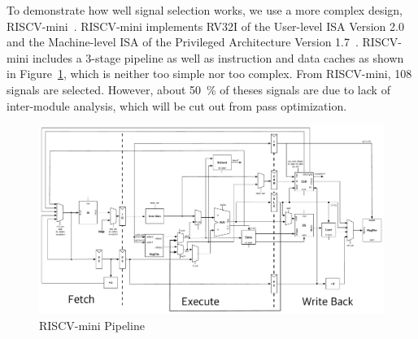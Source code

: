 To demonstrate how well signal selection works, we use a more complex design, RISCV-mini~\cite{riscv-mini}. 
RISCV-mini implements RV32I of the User-level ISA Version 2.0~\cite{riscv-user-2.0} and
the Machine-level ISA of the Privileged Architecture Version 1.7~\cite{riscv-prev-1.7}.
RISCV-mini includes a 3-stage pipeline as well as instruction and data caches as shown
in Figure~\ref{fig:riscv_mini}, which is neither too simple nor too complex.
From RISCV-mini, 108 signals are selected. However, about 50~\% of theses signals
are due to lack of inter-module analysis, which will be cut out from pass optimization.

\begin{figure}
 	\centering
 	\includegraphics[width=\columnwidth,height=\textheight,keepaspectratio]{images/riscv_mini.pdf}
 	\caption{RISCV-mini Pipeline}
 	\label{fig:riscv_mini}
\end{figure}